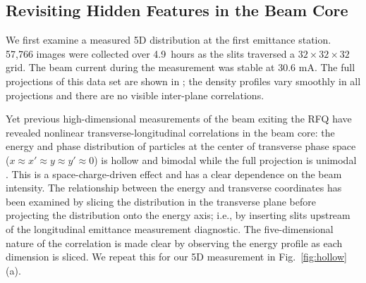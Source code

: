 \documentclass[letterpaper,
               nospread,
               biblatex,
              ]{jacow}
\begin{document}
\subsection{Revisiting Hidden Features in the Beam Core}

We first examine a measured 5D distribution at the first emittance station. 57,766 images were collected over 4.9~hours as the slits traversed a $32 \times 32 \times 32$ grid. The beam current during the measurement was stable at 30.6 mA. The full projections of this data set are shown in \cite{Ruisard2022-NAPAC}; the density profiles vary smoothly in all projections and there are no visible inter-plane correlations.

Yet previous high-dimensional measurements of the beam exiting the RFQ have revealed nonlinear transverse-longitudinal correlations in the beam core: the energy and phase distribution of particles at the center of transverse phase space ($x \approx x' \approx y \approx y' \approx 0$) is hollow and bimodal while the full projection is unimodal \cite{Cathey2018}. This is a space-charge-driven effect \cite{Ruisard2021-hollow} and has a clear dependence on the beam intensity. The relationship between the energy and transverse coordinates has been examined by slicing the distribution in the transverse plane before projecting the distribution onto the energy axis; i.e., by inserting slits upstream of the longitudinal emittance measurement diagnostic. The five-dimensional nature of the correlation is made clear by observing the energy profile as each dimension is sliced. We repeat this for our 5D measurement in Fig.~\ref{fig:hollow}(a).
%
\end{document}
